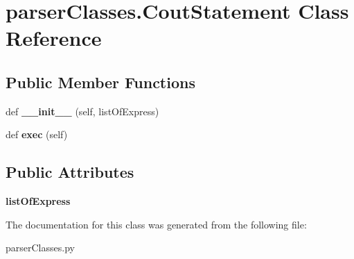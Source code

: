 \hypertarget{classparser_classes_1_1_cout_statement}{}\section{parser\+Classes.\+Cout\+Statement Class Reference}
\label{classparser_classes_1_1_cout_statement}
\subsection*{Public Member Functions}
\begin{DoxyCompactItemize}
\item 
\mbox{\label{classparser_classes_1_1_cout_statement_ad06ead1f60e93546e7445ce5d0219504}} 
def {\bfseries \+\_\+\+\_\+init\+\_\+\+\_\+} (self, list\+Of\+Express)
\item 
\mbox{\label{classparser_classes_1_1_cout_statement_a8a94c5c6abe84a07b91e3558a39fa640}} 
def {\bfseries exec} (self)
\end{DoxyCompactItemize}
\subsection*{Public Attributes}
\begin{DoxyCompactItemize}
\item 
\mbox{\label{classparser_classes_1_1_cout_statement_a07537d9231860bf00d245bcca3766986}} 
{\bfseries list\+Of\+Express}
\end{DoxyCompactItemize}


The documentation for this class was generated from the following file\+:\begin{DoxyCompactItemize}
\item 
parser\+Classes.\+py\end{DoxyCompactItemize}
